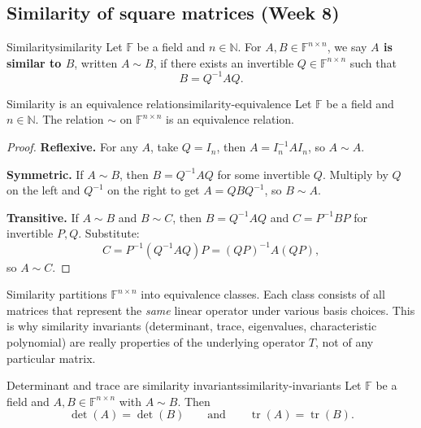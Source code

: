 
\subsection{Similarity of square matrices (Week 8)}

\begin{definition}{Similarity}{similarity}
Let $\mathbb{F}$ be a field and $n\in\mathbb{N}$.
For $A,B\in\mathbb{F}^{n\times n}$, we say \textbf{$A$ is similar to $B$}, written $A\sim B$, if there exists an invertible
$Q\in\mathbb{F}^{n\times n}$ such that
\[
B=Q^{-1}AQ.
\]
\end{definition}

\begin{theorem}{Similarity is an equivalence relation}{similarity-equivalence}
Let $\mathbb{F}$ be a field and $n\in\mathbb{N}$. The relation $\sim$ on $\mathbb{F}^{n\times n}$ is an equivalence relation.
\end{theorem}

\begin{proof}
\textbf{Reflexive.} For any $A$, take $Q=I_n$, then $A=I_n^{-1}AI_n$, so $A\sim A$.

\textbf{Symmetric.} If $A\sim B$, then $B=Q^{-1}AQ$ for some invertible $Q$.
Multiply by $Q$ on the left and $Q^{-1}$ on the right to get $A=QBQ^{-1}$, so $B\sim A$.

\textbf{Transitive.} If $A\sim B$ and $B\sim C$, then $B=Q^{-1}AQ$ and $C=P^{-1}BP$ for invertible $P,Q$.
Substitute:
\[
C=P^{-1}(Q^{-1}AQ)P=(QP)^{-1}A(QP),
\]
so $A\sim C$.

\end{proof}

Similarity partitions $\mathbb{F}^{n\times n}$ into equivalence classes.
Each class consists of all matrices that represent the \emph{same} linear operator under various basis choices.
This is why similarity invariants (determinant, trace, eigenvalues, characteristic polynomial) are really properties of the underlying operator $T$, not of any particular matrix.

\begin{theorem}{Determinant and trace are similarity invariants}{similarity-invariants}
Let $\mathbb{F}$ be a field and $A,B\in\mathbb{F}^{n\times n}$ with $A\sim B$. Then
\[
\det(A)=\det(B)\qquad\text{and}\qquad \operatorname{tr}(A)=\operatorname{tr}(B).
\]
\end{theorem}

